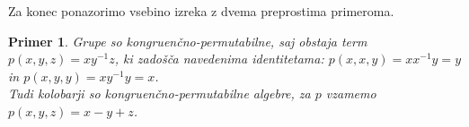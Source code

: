 \documentclass[a4paper,11pt]{article}
\newtheorem{primer}{Primer}
\begin{document}
Za konec ponazorimo vsebino izreka z dvema preprostima primeroma.

\begin{primer}
    Grupe so kongruenčno-permutabilne, saj obstaja term $p(x,y,z)=xy^{-1}z$, ki zadošča navedenima identitetama:
    $p(x,x,y)= xx^{-1}y=y$ in $p(x, y, y)=xy^{-1}y=x$.\\
    Tudi kolobarji so kongruenčno-permutabilne algebre, za $p$ vzamemo $p(x,y,z)= x-y+z$.
\end{primer}


\end{document}

